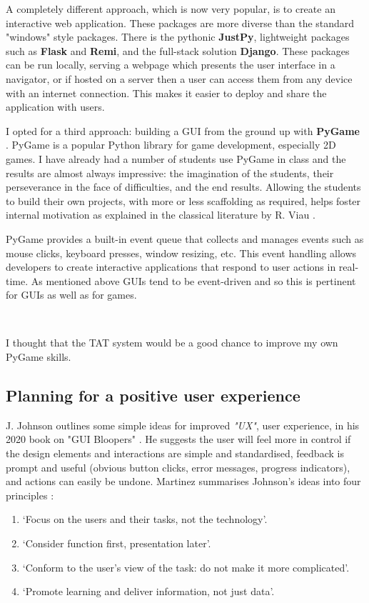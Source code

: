 \documentclass[10pt]{article}
\begin{document}
A completely different approach, which is now very popular, is to create an interactive web application. These packages are more diverse than the standard "windows" style packages. There is the pythonic \textbf{JustPy}, lightweight packages such as \textbf{Flask} and \textbf{Remi}, and the full-stack solution \textbf{Django}. These packages can be run locally, serving a webpage which presents the user interface in a navigator, or if hosted on a server then a user can access them from any device with an internet connection. This makes it easier to deploy and share the application with users.

I opted for a third approach: building a GUI from the ground up with \textbf{PyGame} \cite{KK16}. PyGame is a popular Python library for game development, especially 2D games. I have already had a number of students use PyGame in class and the results are almost always impressive: the imagination of the students, their perseverance in the face of difficulties, and the end results. Allowing the students to build their own projects, with more or less scaffolding as required, helps foster internal motivation as explained in the classical literature by R. Viau \cite{Viau94}.

PyGame provides a built-in event queue that collects and manages events such as mouse clicks, keyboard presses, window resizing, etc. This event handling allows developers to create interactive applications that respond to user actions in real-time. As mentioned above GUIs tend to be event-driven and so this is pertinent for GUIs as well as for games.

\

I thought that the TAT system would be a good chance to improve my own PyGame skills.


\subsection{Planning for a positive user experience}
J. Johnson outlines some simple ideas for improved \emph{"UX"}, user experience, in his 2020 book on "GUI Bloopers" \cite{JJo20}. He suggests the user will feel more in control if the design elements and interactions are simple and standardised, feedback is prompt and useful (obvious button clicks, error messages, progress indicators), and actions can easily be undone. Martinez summarises Johnson's ideas into four principles \cite[p. 123]{Mart11}:
\begin{enumerate}
\item ‘Focus on the users and their tasks, not the technology’.
\item ‘Consider function first, presentation later’.
\item ‘Conform to the user’s view of the task: do not make it more complicated’.
\item ‘Promote learning and deliver information, not just data’.
\end{enumerate}
\end{document}
